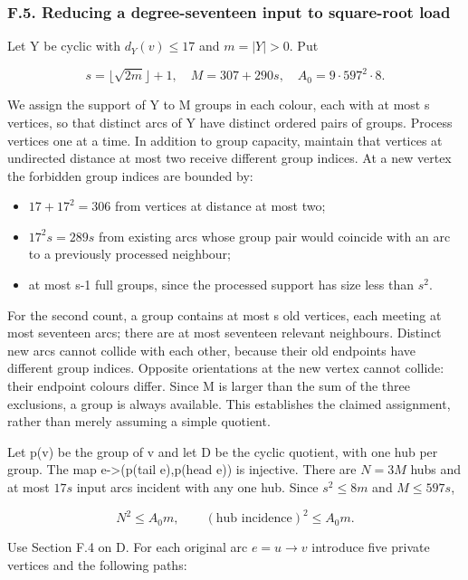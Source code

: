 \documentclass[english,11pt,a4paper]{article}
\providecommand{\tightlist}{\setlength{\itemsep}{0pt}\setlength{\parskip}{0pt}}
\begin{document}
\subsubsection{F.5. Reducing a degree-seventeen input to square-root load}\label{f.5.-reducing-a-degree-seventeen-input-to-square-root-load}

Let Y be cyclic with \(d_{Y}(v)\le 17\) and \(m=|Y|>0\). Put

\[s=\lfloor\sqrt{2m}\rfloor+1,\quad M=307+290s,\quad A_0=9\cdot597^2\cdot8.\tag{F.7}\]

We assign the support of Y to M groups in each colour, each with at most s vertices, so that distinct arcs of Y have distinct ordered pairs of groups. Process vertices one at a time. In addition to group capacity, maintain that vertices at undirected distance at most two receive different group indices. At a new vertex the forbidden group indices are bounded by:

\begin{itemize}
\tightlist
\item
  \(17+17^{2}=306\) from vertices at distance at most two;
\item
  \(17^2s=289s\) from existing arcs whose group pair would coincide with an arc to a previously processed neighbour;
\item
  at most s-1 full groups, since the processed support has size less than \(s^{2}\).
\end{itemize}

For the second count, a group contains at most s old vertices, each meeting at most seventeen arcs; there are at most seventeen relevant neighbours. Distinct new arcs cannot collide with each other, because their old endpoints have different group indices. Opposite orientations at the new vertex cannot collide: their endpoint colours differ. Since M is larger than the sum of the three exclusions, a group is always available. This establishes the claimed assignment, rather than merely assuming a simple quotient.

Let p(v) be the group of v and let D be the cyclic quotient, with one hub per group. The map e-\textgreater(p(tail e),p(head e)) is injective. There are \(N=3M\) hubs and at most \(17s\) input arcs incident with any one hub. Since \(s^{2}\le 8m\) and \(M\le 597s\),

\[N^2\le A_0m,\qquad(\text{hub incidence})^2\le A_0m.\tag{F.8}\]

Use Section F.4 on D. For each original arc \(e=u\to v\) introduce five private vertices and the following paths:
\end{document}
